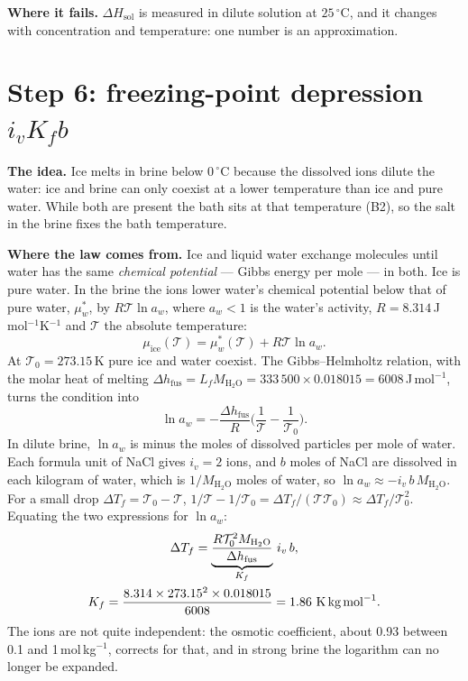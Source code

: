 \documentclass[11pt,a4paper]{article}
\newcommand{\dC}{\,{}^{\circ}\mathrm{C}}
\newcommand{\Hsol}{\Delta H_{\mathrm{sol}}}
\newcommand{\Tabs}{\mathcal{T}}
\newcommand{\para}[1]{\par\smallskip\noindent\textbf{#1}\enspace}
\begin{document}
\para{Where it fails.} $\Hsol$ is measured in dilute solution at $25\dC$, and it changes with concentration
and temperature: one number is an approximation.

\section{\texorpdfstring{Step 6: freezing-point depression $i_vK_fb$}{Step 6: freezing-point depression}}\label{sec:s6}

\para{The idea.} Ice melts in brine below $0\dC$ because the dissolved ions dilute the water: ice and brine
can only coexist at a lower temperature than ice and pure water. While both are present the bath sits at
that temperature (B2), so the salt in the brine fixes the bath temperature.

\para{Where the law comes from.} Ice and liquid water exchange molecules until water has the same
\emph{chemical potential} --- Gibbs energy per mole --- in both. Ice is pure water. In the brine the ions
lower water's chemical potential below that of pure water, $\mu_w^*$, by $R\Tabs\ln a_w$, where $a_w < 1$ is
the water's activity, $R = 8.314$\,J\,mol$^{-1}$K$^{-1}$ and $\Tabs$ the absolute temperature:
\[
\mu_{\mathrm{ice}}(\Tabs) = \mu_w^*(\Tabs) + R\Tabs\ln a_w .
\]
At $\Tabs_0 = 273.15$\,K pure ice and water coexist. The Gibbs--Helmholtz relation, with the molar heat of
melting $\Delta h_{\mathrm{fus}} = L_fM_{\mathrm{H_2O}} = 333\,500\times0.018015 = 6008$\,J\,mol$^{-1}$,
turns the condition into
\[
\ln a_w = -\frac{\Delta h_{\mathrm{fus}}}{R}\Big(\frac{1}{\Tabs} - \frac{1}{\Tabs_0}\Big).
\]
In dilute brine, $\ln a_w$ is minus the moles of dissolved particles per mole of water. Each formula unit of
NaCl gives $i_v = 2$ ions, and $b$ moles of NaCl are dissolved in each kilogram of water, which is
$1/M_{\mathrm{H_2O}}$ moles of water, so $\ln a_w \approx -i_v\,b\,M_{\mathrm{H_2O}}$. For a small drop
$\Delta T_f = \Tabs_0 - \Tabs$, $1/\Tabs - 1/\Tabs_0 = \Delta T_f/(\Tabs\Tabs_0) \approx \Delta T_f/\Tabs_0^2$.
Equating the two expressions for $\ln a_w$:
\begin{gather}
\Delta T_f = \underbrace{\frac{R\Tabs_0^2M_{\mathrm{H_2O}}}{\Delta h_{\mathrm{fus}}}}_{K_f}\, i_v\, b , \label{eq:s6-Kf}\\
K_f = \frac{8.314\times273.15^2\times0.018015}{6008} = 1.86\ \text{K\,kg\,mol}^{-1}. \notag
\end{gather}
The ions are not quite independent: the osmotic coefficient, about 0.93 between 0.1 and 1\,mol\,kg$^{-1}$,
corrects for that, and in strong brine the logarithm can no longer be expanded.
\end{document}
